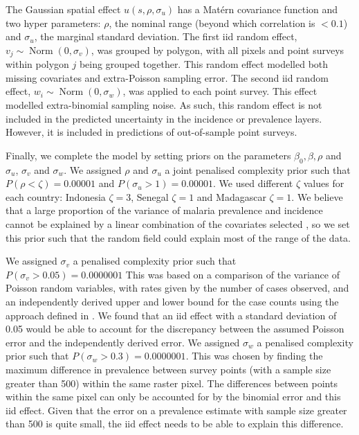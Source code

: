 \documentclass[10pt,letterpaper]{article}
\begin{document}
The Gaussian spatial effect $u(s, \rho, \sigma_u)$ has a Mat\'ern covariance function and two hyper parameters: $\rho$, the nominal range (beyond which correlation is $< 0.1$) and $\sigma_u$, the marginal standard deviation.
The first iid random effect, $v_j \sim \operatorname{Norm}(0, \sigma_v)$,  was grouped by polygon, with all pixels and point surveys within polygon $j$ being grouped together.
This random effect modelled both missing covariates and extra-Poisson sampling error. 
The second iid random effect, $w_i \sim \operatorname{Norm}(0, \sigma_w)$, was applied to each point survey.
This effect modelled extra-binomial sampling noise.
As such, this random effect is not included in the predicted uncertainty in the incidence or prevalence layers.
However, it is included in predictions of out-of-sample point surveys.

Finally, we complete the model by setting priors on the parameters $\beta_0, \beta, \rho$ and $\sigma_u$, $\sigma_v$ and $\sigma_w$.
We assigned $\rho$ and $\sigma_u$ a joint penalised complexity prior \cite{fuglstad2018constructing} such that $P(\rho < \zeta) = 0.00001$ and $P(\sigma_u > 1) = 0.00001$.
We used different $\zeta$ values for each country: Indonesia $\zeta = 3$, Senegal $\zeta = 1$ and Madagascar $\zeta = 1$.
We believe that a large proportion of the variance of malaria prevalence and incidence cannot be explained by a linear combination of the covariates selected \cite{bhatt2017improved}, so we set this prior such that the random field could explain most of the range of the data.

We assigned $\sigma_v$ a penalised complexity prior \cite{simpson2017penalising} such that $P(\sigma_v > 0.05) = 0.0000001$
This was based on a comparison of the variance of Poisson random variables, with rates given by the number of cases observed, and an independently derived upper and lower bound for the case counts using the approach defined in \cite{cibulskis2011worldwide}.
We found that an iid effect with a standard deviation of 0.05 would be able to account for the discrepancy between the assumed Poisson error and the independently derived error.
We assigned $\sigma_w$ a penalised complexity prior such that $P(\sigma_w > 0.3) = 0.0000001$. 
This was chosen by finding the maximum difference in prevalence between survey points (with a sample size greater than 500) within the same raster pixel.
The differences between points within the same pixel can only be accounted for by the binomial error and this iid effect.
Given that the error on a prevalence estimate with sample size greater than 500 is quite small, the iid effect needs to be able to explain this difference.
\end{document}
